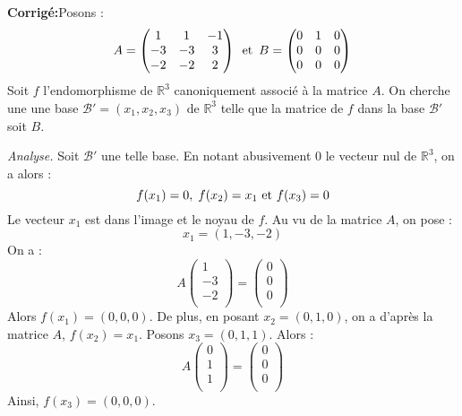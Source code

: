 \documentclass[a4paper,twoside,french,11pt]{VcCours}
\newcommand{\corr}{\textbf{Corrigé:}}
\begin{document}
\corr Posons :
$$ A = \begin{pmatrix}
1 & 1 & -1 \\
-3 & -3 & 3 \\
-2 & -2 & 2 \\
\end{pmatrix} \, \hbox{ et } \,   B = \begin{pmatrix}
0 & 1 & 0 \\
0 & 0 & 0 \\
0 & 0 & 0 \\
\end{pmatrix}$$
Soit $f$ l'endomorphisme  de $\mathbb{R}^3$ canoniquement associé à la matrice $A$. On cherche une une base $\mathcal{B}'=(x_1,x_2,x_3)$ de $\mathbb{R}^3$ telle que la matrice de $f$ dans la base $\mathcal{B}'$ soit $B$. 



\noindent \textit{Analyse.} Soit $\mathcal{B}'$ une telle base. En notant abusivement $0$ le vecteur nul de $\mathbb{R}^3$, on a alors :
$$ f(x_1)=0, \; f(x_2)=x_1 \hbox{ et } f(x_3)=0$$
Le vecteur $x_1$ est dans l'image et le noyau de $f$. Au vu de la matrice $A$, on pose :
$$ x_1 =(1,-3,-2)$$
On a :
$$ A \begin{pmatrix}
1 \\
-3 \\
-2\\
\end{pmatrix} = \begin{pmatrix}
0 \\
0 \\
0\\
\end{pmatrix}$$
Alors $f(x_1)=(0,0,0)$. De plus, en posant $x_2=(0,1,0)$, on a d'après la matrice $A$, $f(x_2)=x_1$. Posons $x_3=(0,1,1)$. Alors :
$$  A \begin{pmatrix}
0 \\
1 \\
1\\
\end{pmatrix} = \begin{pmatrix}
0 \\
0\\
0\\
\end{pmatrix}$$
Ainsi, $f(x_3)=(0,0,0)$.
\end{document}
